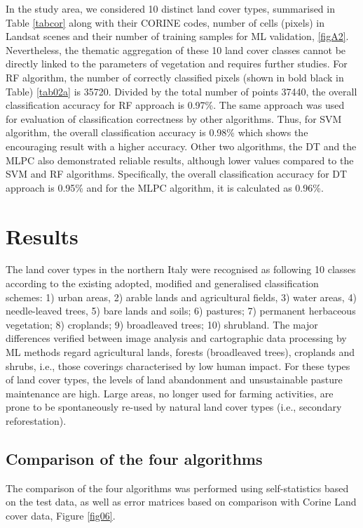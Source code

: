 \documentclass[jimaging,article,submit,pdftex,moreauthors]{Definitions/mdpi}
\begin{document}
In the study area, we {considered 10 distinct land cover types}, summarised in Table \ref{tabcor} along with their CORINE codes, number of cells (pixels) in Landsat scenes and their number of training samples for ML validation, \ref{figA2}. Nevertheless, the thematic aggregation of these 10 land cover classes cannot be directly linked to the parameters of vegetation and requires further studies{. For} RF algorithm, the number of correctly classified pixels (shown in bold black in Table) \ref{tab02a} is 35720. Divided by the total number of points 37440, the overall classification accuracy for RF approach is 0.97\%. The same approach was used for evaluation of classification correctness by other algorithms. Thus, for SVM algorithm, the overall classification accuracy is 0.98\% which shows the encouraging result with a higher accuracy. Other two algorithms, the DT and the MLPC also demonstrated reliable results, although lower values compared to the SVM and RF algorithms. Specifically, the overall classification accuracy for DT approach is 0.95\% and for the MLPC algorithm, it is calculated as 0.96\%. 

\section{Results}\label{sec4}

The land cover types in the northern Italy were recognised as following 10 classes according to the existing adopted, modified and generalised classification schemes: 1) urban areas, 2) arable lands and agricultural fields, 3) water areas, 4) needle-leaved trees, 5) bare lands and soils; 6) pastures; 7) permanent herbaceous vegetation; 8) croplands; 9) broadleaved trees; 10) shrubland.  The major differences verified between image analysis and cartographic data processing by ML methods regard agricultural lands, forests (broadleaved trees), croplands and shrubs, i.e., those coverings characterised by low human impact. For these types of land cover types, the levels of land abandonment and unsustainable pasture maintenance are high. Large areas, no longer used for farming activities, are prone to be spontaneously re-used by natural land cover types (i.e., secondary reforestation). 

\subsection{Comparison of the four algorithms}

The comparison of the four algorithms was performed using self-statistics based on the test data, as well as error matrices based on comparison with Corine Land cover data, Figure \ref{fig06}. 
\end{document}
